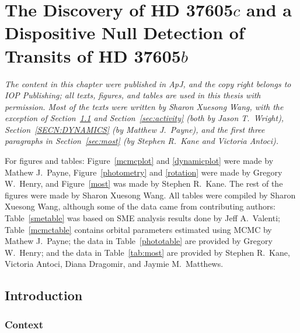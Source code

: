 \chapter{The Discovery of HD 37605\lowercase{$c$} and a Dispositive
  Null Detection of Transits of HD 37605\lowercase{$b$}}\label{chap:planets}

{\it
  The content in this chapter were published in ApJ, and the copy
  right belongs to IOP Publishing; all texts, figures, and tables are
  used in this thesis with permission. Most of the texts were written
  by Sharon Xuesong Wang, with the exception of
  Section~\ref{sec:intro} and Section~\ref{sec:activity} (both by
  Jason T.\ Wright), Section~\ref{SECN:DYNAMICS} (by Matthew
  J.\ Payne), and the first three paragraphs in Section~\ref{sec:most}
  (by Stephen R.\ Kane and Victoria Antoci).

  For figures and tables: Figure~\ref{mcmcplot} and \ref{dynamicplot}
  were made by Mathew J.\ Payne, Figure~\ref{photometry} and
  \ref{rotation} were made by Gregory W.\ Henry, and Figure~\ref{most}
  was made by Stephen R.\ Kane. The rest of the figures were made by
  Sharon Xuesong Wang. All tables were compiled by Sharon Xuesong
  Wang, although some of the data came from contributing authors:
  Table~\ref{smetable} was based on SME analysis results done by Jeff
  A.\ Valenti; Table~\ref{mcmctable} contains orbital parameters
  estimated using MCMC by Mathew J.\ Payne; the data in
  Table~\ref{phototable} are provided by Gregory W.\ Henry; and the
  data in Table~\ref{tab:most} are provided by Stephen R.\ Kane,
  Victoria Antoci, Diana Dragomir, and Jaymie M.\ Matthews.

}

\section{Introduction}\label{sec:intro}

\subsection{Context}

